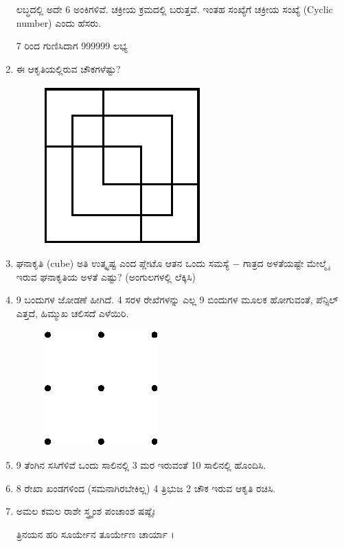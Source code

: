 \begin{enumerate}
ಲಬ್ಧದಲ್ಲಿ ಅದೇ 6 ಅಂಕಿಗಳಿವೆ. ಚಕ್ರೀಯ ಕ್ರಮದಲ್ಲಿ ಬರುತ್ತವೆ. ಇಂತಹ ಸಂಖ್ಯೆಗೆ ಚಕ್ರೀಯ ಸಂಖ್ಯೆ (Cyclic number) ಎಂದು ಹೆಸರು. 

7 ರಿಂದ ಗುಣಿಸಿದಾಗ 999999 ಲಭ್ಯ

\item ಈ ಆಕೃತಿಯಲ್ಲಿರುವ ಚೌಕಗಳೆಷ್ಟು?
\begin{figure}[H]
\centering
\includegraphics{images/chap2/q20.eps}
\end{figure}
 
\item ಘನಾಕೃತಿ (cube) ಅತಿ ಉತ್ಕೃಷ್ಟ ಎಂದ ಪ್ಲೇಟೊ ಆತನ ಒಂದು ಸಮಸ್ಯೆ $-$ ಗಾತ್ರದ ಅಳತೆಯಷ್ಟೇ ಮೇಲ್ಮೈ ಇರುವ ಘನಾಕೃತಿಯ ಅಳತೆ ಎಷ್ಟು? (ಅಂಗುಲಗಳಲ್ಲಿ ಲೆಕ್ಕಿಸಿ)

\item 9 ಬಂದುಗಳ ಜೋಡಣೆ ಹೀಗಿದೆ. 4 ಸರಳ ರೇಖೆಗಳನ್ನು ಎಲ್ಲ 9 ಬಿಂದುಗಳ ಮೂಲಕ ಹೋಗುವಂತೆ, ಪೆನ್ಸಿಲ್ ಎತ್ತದೆ, ಹಿಮ್ಮುಖ ಚಲಿಸದೆ ಎಳೆಯಿರಿ. 
\begin{figure}[H]
\centering
\includegraphics{images/chap2/q22.eps}
\end{figure}
 
 \item 9 ತೆಂಗಿನ ಸಸಿಗೆಳಿವೆ ಒಂದು ಸಾಲಿನಲ್ಲಿ 3 ಮರ ಇರುವಂತೆ 10 ಸಾಲಿನಲ್ಲಿ ಹೊಂದಿಸಿ.
 
 \item 8 ರೇಖಾ ಖಂಡಗಳಿಂದ (ಸಮನಾಗಿರಬೇಕಿಲ್ಲ) 4 ತ್ರಿಭುಜ 2 ಚೌಕ ಇರುವ ಆಕೃತಿ ರಚಿಸಿ. 
 
 \item ಅಮಲ ಕಮಲ ರಾಶೇ ಸ್ತ್ರ್ಯಂಶ ಪಂಚಾಂಶ ಷಷ್ಠೈಃ 
 
 ತ್ರಿನಯನ ಹರಿ ಸೂರ್ಯೇನ ತೂರ್ಯೇಣ ಚಾರ್ಯಾ ।
 

\end{enumerate}
